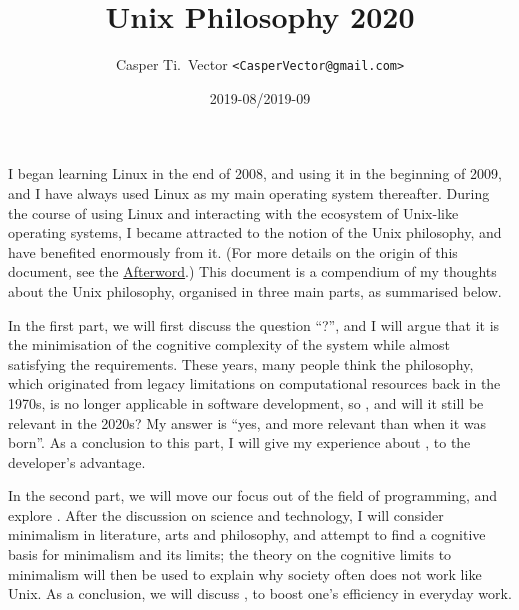\documentclass{article}
\begin{document}
\title{\textbf{Unix Philosophy 2020}}
\author{Casper Ti.\ Vector \texttt{<CasperVector@gmail.com>}}
\date{2019-08/2019-09}
\maketitle
\vspace{\baselineskip}
\tableofcontents


I began learning Linux in the end of 2008, and using it in the beginning of
2009, and I have always used Linux as my main operating system thereafter.
During the course of using Linux and interacting with the ecosystem of
Unix-like operating systems, I became attracted to the notion of the Unix
philosophy, and have benefited enormously from it.  (For more details on
the origin of this document, see the \hyperref[sec:afterword]{Afterword}.)
This document is a compendium of my thoughts about the Unix philosophy,
organised in three main parts, as summarised below.

In the first part, we will first discuss the question ``?'', and I will argue that it is the minimisation
of the cognitive complexity of the system while almost satisfying the
requirements.  These years, many people think the philosophy, which originated
from legacy limitations on computational resources back in the 1970s, is no
longer applicable in software development, so , and will it still be relevant in the 2020s?  My answer is
``yes, and more relevant than when it was born''.  As a conclusion to this part,
I will give my experience about , to the developer's advantage.

In the second part, we will move our focus out of the field of programming, and
explore .  After the discussion on
science and technology, I will consider minimalism in literature, arts and
philosophy, and attempt to find a cognitive basis for minimalism and its limits;
the theory on the cognitive limits to minimalism will then be used to explain
why society often does not work like Unix.  As a conclusion, we will discuss
,
to boost one's efficiency in everyday work.
\end{document}
